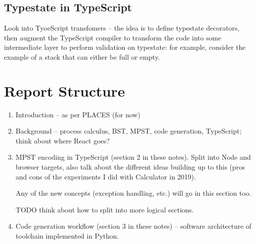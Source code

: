 \documentclass{article}
\begin{document}
\subsection*{Typestate in TypeScript}

Look into TyoeScript transfomers -- the idea is
to define typestate decorators, then augment the
TypeScript compiler to transform the code into some
intermediate layer to perform validation on
typestate: for example, consider the example of a 
stack that can either be full or empty.

\section{Report Structure}

\begin{enumerate}
\item 
Introduction -- as per PLACES (for now)

\item
Background -- process calculus, BST, MPST, code 
generation, TypeScript; think about where React goes?

\item
MPST encoding in TypeScript (section 2 in these notes).
Split into Node and browser targets, also talk about
the different ideas building up to this (pros and
cons of the experiments I did with Calculator in
2019).

Any of the new concepts (exception handling, etc.) will 
go in this section too.

TODO think about how to split into 
more logical sections.

\item
Code generation workflow (section 3 in these notes)
-- software architecture of
toolchain implemented in Python.

\end{enumerate}

\nocite{*}


\end{document}
